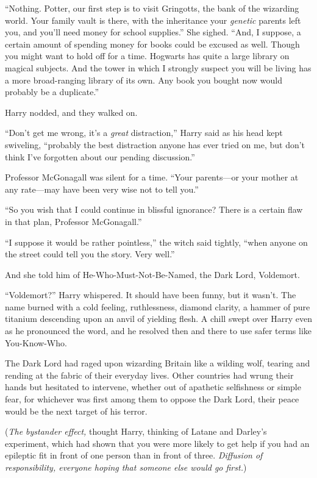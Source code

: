 “Nothing. Potter, our first step is to visit Gringotts, the bank of the
wizarding world. Your family vault is there, with the
inheritance your \emph{genetic} parents left you, and you’ll need money for
school supplies.” She sighed. “And, I suppose, a certain amount of spending
money for books could be excused as well. Though you might want to hold off for
a time. Hogwarts has quite a large library on magical subjects. And the tower
in which I strongly suspect you will be living has a more broad-ranging
library of its own. Any book you bought now would probably be a duplicate.”

Harry nodded, and they walked on.

“Don’t get me wrong, it’s a \emph{great} distraction,” Harry said as his head
kept swiveling, “probably the best distraction anyone has ever tried on me,
but don’t think I’ve forgotten about our pending discussion.”

Professor McGonagall was silent for a time.
“Your parents—or your mother at any rate—may
have been very wise not to tell you.”

“So you wish that I could continue in blissful ignorance? There is a certain
flaw in that plan, Professor McGonagall.”

“I suppose it would be rather pointless,” the witch said tightly, “when anyone
on the street could tell you the story. Very well.”

And she told him of He-Who-Must-Not-Be-Named, the Dark Lord, Voldemort.

“Voldemort?” Harry whispered. It should have been funny, but it wasn’t. The
name burned with a cold feeling, ruthlessness, diamond clarity, a hammer of
pure titanium descending upon an anvil of yielding flesh. A chill swept over
Harry even as he pronounced the word, and he resolved then and there to use
safer terms like You-Know-Who.

The Dark Lord had raged upon wizarding Britain like a wilding wolf, tearing and
rending at the fabric of their everyday lives. Other countries had wrung their
hands but hesitated to intervene, whether out of apathetic selfishness or
simple fear, for whichever was first among them to oppose the Dark Lord, their
peace would be the next target of his terror.

(\emph{The bystander effect,} thought Harry, thinking of Latane and Darley’s
experiment, which had shown that you were more likely to get help if you had an
epileptic fit in front of one person than in front of three. \emph{Diffusion of
responsibility, everyone hoping that someone else would go first.})

